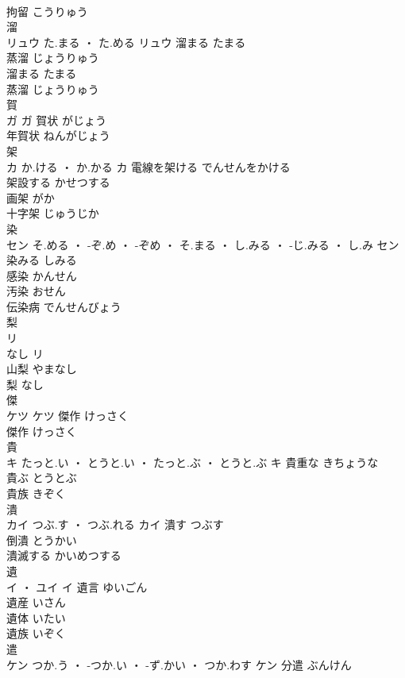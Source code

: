 \documentclass[8pt]{extreport}
\begin{document}
\begin{CJK}{UTF8}{min}
\\	拘留	こうりゅう	
\\	溜	
\\	リュウ	た.まる ・ た.める	リュウ	溜まる	たまる	
\\	蒸溜	じょうりゅう	
\\	溜まる	たまる	
\\	蒸溜	じょうりゅう	
\\	賀	
\\	ガ		ガ	賀状	がじょう	
\\	年賀状	ねんがじょう	
\\	架	
\\	カ	か.ける ・ か.かる	カ	電線を架ける	でんせんをかける	
\\	架設する	かせつする	
\\	画架	がか	
\\	十字架	じゅうじか	
\\	染	
\\	セン	そ.める ・ -ぞ.め ・ -ぞめ ・ そ.まる ・ し.みる ・ -じ.みる ・ し.み	セン	染みる	しみる	
\\	感染	かんせん	
\\	汚染	おせん	
\\	伝染病	でんせんびょう	
\\	梨	
\\	リ
\\	なし	リ
\\	山梨	やまなし	
\\	梨	なし	
\\	傑	
\\	ケツ		ケツ	傑作	けっさく	
\\	傑作	けっさく	
\\	貴	
\\	キ	たっと.い ・ とうと.い ・ たっと.ぶ ・ とうと.ぶ	キ	貴重な	きちょうな	
\\	貴ぶ	とうとぶ	
\\	貴族	きぞく	
\\	潰	
\\	カイ	つぶ.す ・ つぶ.れる	カイ	潰す	つぶす	
\\	倒潰	とうかい	
\\	潰滅する	かいめつする	
\\	遺	
\\	イ ・ ユイ		イ	遺言	ゆいごん	
\\	遺産	いさん	
\\	遺体	いたい	
\\	遺族	いぞく	
\\	遣	
\\	ケン	つか.う ・ -つか.い ・ -ず.かい ・ つか.わす	ケン	分遣	ぶんけん	

\end{CJK}
\end{document}
